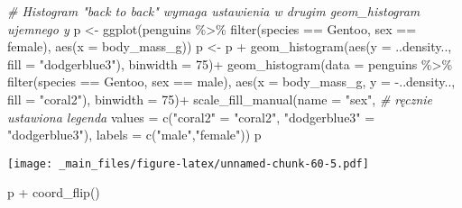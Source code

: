 \documentclass[
]{book}
\newenvironment{Shaded}{\begin{snugshade}}{\end{snugshade}}
\newcommand{\AttributeTok}[1]{\textcolor[rgb]{0.77,0.63,0.00}{#1}}
\newcommand{\CommentTok}[1]{\textcolor[rgb]{0.56,0.35,0.01}{\textit{#1}}}
\newcommand{\DecValTok}[1]{\textcolor[rgb]{0.00,0.00,0.81}{#1}}
\newcommand{\FunctionTok}[1]{\textcolor[rgb]{0.00,0.00,0.00}{#1}}
\newcommand{\NormalTok}[1]{#1}
\newcommand{\OtherTok}[1]{\textcolor[rgb]{0.56,0.35,0.01}{#1}}
\newcommand{\SpecialCharTok}[1]{\textcolor[rgb]{0.00,0.00,0.00}{#1}}
\newcommand{\StringTok}[1]{\textcolor[rgb]{0.31,0.60,0.02}{#1}}
\begin{document}
\begin{Shaded}
\begin{Highlighting}[]
\CommentTok{\# Histogram "back to back" wymaga ustawienia w drugim geom\_histogram ujemnego y}
\NormalTok{p }\OtherTok{\textless{}{-}} \FunctionTok{ggplot}\NormalTok{(penguins }\SpecialCharTok{\%\textgreater{}\%} \FunctionTok{filter}\NormalTok{(species }\SpecialCharTok{==} \StringTok{\textquotesingle{}Gentoo\textquotesingle{}}\NormalTok{, sex }\SpecialCharTok{==} \StringTok{\textquotesingle{}female\textquotesingle{}}\NormalTok{), }
            \FunctionTok{aes}\NormalTok{(}\AttributeTok{x =}\NormalTok{ body\_mass\_g))}
\NormalTok{p }\OtherTok{\textless{}{-}}\NormalTok{ p }\SpecialCharTok{+} \FunctionTok{geom\_histogram}\NormalTok{(}\FunctionTok{aes}\NormalTok{(}\AttributeTok{y =}\NormalTok{ ..density.., }\AttributeTok{fill =} \StringTok{"dodgerblue3"}\NormalTok{), }\AttributeTok{binwidth =} \DecValTok{75}\NormalTok{)}\SpecialCharTok{+}
  \FunctionTok{geom\_histogram}\NormalTok{(}\AttributeTok{data =}\NormalTok{ penguins }\SpecialCharTok{\%\textgreater{}\%} \FunctionTok{filter}\NormalTok{(species }\SpecialCharTok{==} \StringTok{\textquotesingle{}Gentoo\textquotesingle{}}\NormalTok{, sex }\SpecialCharTok{==} \StringTok{\textquotesingle{}male\textquotesingle{}}\NormalTok{),}
                 \FunctionTok{aes}\NormalTok{(}\AttributeTok{x =}\NormalTok{ body\_mass\_g, }\AttributeTok{y =} \SpecialCharTok{{-}}\NormalTok{..density.., }\AttributeTok{fill =} \StringTok{"coral2"}\NormalTok{),}
                 \AttributeTok{binwidth =} \DecValTok{75}\NormalTok{)}\SpecialCharTok{+}
  \FunctionTok{scale\_fill\_manual}\NormalTok{(}\AttributeTok{name =} \StringTok{"sex"}\NormalTok{, }\CommentTok{\# ręcznie ustawiona legenda}
                    \AttributeTok{values =} \FunctionTok{c}\NormalTok{(}\StringTok{"coral2"} \OtherTok{=} \StringTok{"coral2"}\NormalTok{, }\StringTok{"dodgerblue3"} \OtherTok{=} \StringTok{"dodgerblue3"}\NormalTok{), }
                    \AttributeTok{labels =} \FunctionTok{c}\NormalTok{(}\StringTok{"male"}\NormalTok{,}\StringTok{"female"}\NormalTok{))}
\NormalTok{p}
\end{Highlighting}
\end{Shaded}

\texttt{[image: \_main\_files/figure-latex/unnamed-chunk-60-5.pdf]}

\begin{Shaded}
\begin{Highlighting}[]
\NormalTok{p }\SpecialCharTok{+} \FunctionTok{coord\_flip}\NormalTok{()}
\end{Highlighting}
\end{Shaded}
\end{document}
